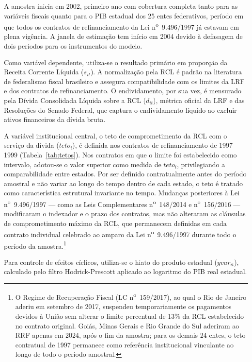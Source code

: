 A amostra inicia em 2002, primeiro ano com cobertura completa tanto para as variáveis fiscais quanto para o PIB estadual dos 25 entes federativos, período em que todos os contratos de refinanciamento da Lei n\textsuperscript{o}~9.496/1997 já estavam em plena vigência. A janela de estimação tem início em 2004 devido à defasagem de dois períodos para os instrumentos do modelo.

Como variável dependente, utiliza-se o resultado primário em proporção da Receita Corrente Líquida ($s_{it}$). A normalização pela RCL é padrão na literatura de federalismo fiscal brasileiro e assegura compatibilidade com os limites da LRF e dos contratos de refinanciamento. O endividamento, por sua vez, é mensurado pela Dívida Consolidada Líquida sobre a RCL ($d_{it}$), métrica oficial da LRF e das Resoluções do Senado Federal, que captura o endividamento líquido ao excluir ativos financeiros da dívida bruta.

A variável institucional central, o teto de comprometimento da RCL com o serviço da dívida ($teto_i$), é definida nos contratos de refinanciamento de 1997--1999 (Tabela~\ref{tab:tetos}). Nos contratos em que o limite foi estabelecido como intervalo, adotou-se o valor superior como medida de $teto_i$, privilegiando a comparabilidade entre estados. Por ser definido contratualmente antes do período amostral e não variar ao longo do tempo dentro de cada estado, o teto é tratado como característica estrutural invariante no tempo. Mudanças posteriores à Lei n\textsuperscript{o}~9.496/1997 --- como as Leis Complementares n\textsuperscript{o}~148/2014 e n\textsuperscript{o}~156/2016 --- modificaram o indexador e o prazo dos contratos, mas não alteraram as cláusulas de comprometimento máximo da RCL, que permanecem definidas em cada contrato individual celebrado ao amparo da Lei n\textsuperscript{o}~9.496/1997 durante todo o período da amostra.\footnote{O Regime de Recuperação Fiscal (LC n\textsuperscript{o}~159/2017), ao qual o Rio de Janeiro aderiu em setembro de 2017, suspendeu temporariamente os pagamentos devidos à União sem alterar o limite percentual de 13\% da RCL estabelecido no contrato original. Goiás, Minas Gerais e Rio Grande do Sul aderiram ao RRF apenas em 2024, após o fim da amostra; para os demais 24 entes, o teto contratual de 1997 permanece como referência institucional vinculante ao longo de todo o período amostral.}

Para controle de efeitos cíclicos, utiliza-se o hiato do produto estadual ($yvar_{it}$), calculado pelo filtro Hodrick-Prescott aplicado ao logaritmo do PIB real estadual.

